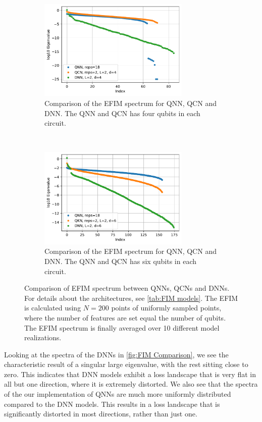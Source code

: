 \begin{figure}[H]
    \centering
    \begin{subfigure}[t]{0.5\textwidth}
        \centering
        \includegraphics[height=1.9in]{latex/figures/FIM_qubits_4.pdf}
        \caption{Comparison of the EFIM spectrum for QNN, QCN and DNN. The QNN and QCN has four qubits in each circuit.}
    \end{subfigure}%
    ~ 
    \begin{subfigure}[t]{0.5\textwidth}
        \centering
        \includegraphics[height=1.9in]{latex/figures/FIM_qubits_6.pdf}
        \caption{Comparison of the EFIM spectrum for QNN, QCN and DNN. The QNN and QCN has six qubits in each circuit.}
    \end{subfigure}
    \caption{Comparison of EFIM spectrum between QNNs, QCNs and DNNs. For details about the architectures, see \autoref{tab:FIM models}. The EFIM is calculated using $N=200$ points of uniformly sampled points, where the number of features are set equal the number of qubits. The EFIM spectrum is finally averaged over 10 different model realizations.}
    \label{fig:FIM Comparison}
\end{figure}

Looking at the spectra of the DNNs in \autoref{fig:FIM Comparison}, we see the characteristic result of a singular large eigenvalue, with the rest sitting close to zero. This indicates that DNN models exhibit a loss landscape that is very flat in all but one direction, where it is extremely distorted. We also see that the spectra of the our implementation of QNNs are much more uniformly distributed compared to the DNN models. This results in a loss landscape that is significantly distorted in most directions, rather than just one. 

